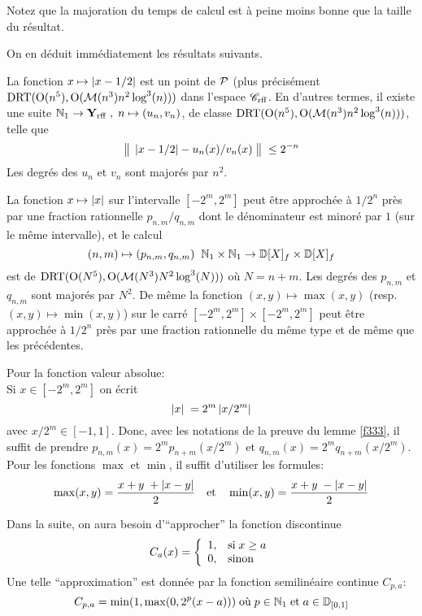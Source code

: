 Notez que la majoration du temps de calcul est à peine moins bonne que la 
taille du résultat.

On en déduit immédiatement les résultats suivants.
\begin{ftheorem} \label{f334}
La fonction   $x \mapsto \left|{ x - 1/2 }\right|$ est un point de \com ${\cal P}$   (plus 
précisément  ${\rm DRT}({\rm O}(n^5), {\rm O}({{{\cal M}}}(n^3) n^2 \log^3(n)))$   
dans l'espace  ${{{\mathscr C}}_{\rm rff}}$. 
En d'autres termes, il existe une suite  
$\mathbb {N}_1 \rightarrow {{\bf Y}_{\rm rff}}  \; , \; 
n \mapsto (u_n,v_n)$, de classe
 ${\rm DRT}({\rm O}(n^5), {\rm O}({{{\cal M}}}(n^3) n^2 \log^3(n)))$, telle que         
\[
\big\lVert  \; \left|{ x-1/2 }\right| - u_n(x)/v_n(x)\;  \big\rVert \; \leq 2^{-n}
\]
Les degrés des \pols  $u_n$  et  $v_n$ sont majorés par   $n^2$.
\end{ftheorem}
\begin{fproposition} \label{f335}
La fonction  $x \mapsto \left|{x}\right|$ sur l'intervalle  $[-2^m , 2^m]$  peut 
être approchée à  $1/2^n$   près  par une fraction rationnelle  
$p_{n,m}/q_{n,m}$  dont le dénominateur est minoré par  $1$  (sur le même 
intervalle),  et le calcul  
$$(n,m) \mapsto (p_{n,m},q_{n,m}) \; \; \mathbb {N}_1 \times \mathbb {N}_1 \rightarrow
 \mathbb {D}[X]_f \times \mathbb {D}[X]_f $$
est de \com  ${\rm DRT}({\rm O}(N^5), {\rm O}({{{\cal M}}}(N^3) N^2 \log^3(N)))$  
où  $N = n+m$.  Les degrés des \pols  
$p_{n,m}$  et  $q_{n,m}$ sont majorés par   $N^2$.
De même la fonction $(x,y) \mapsto \max(x,y)$ 
(resp. $(x,y) \mapsto \min(x,y)$)  sur le carré  
$[-2^m,2^m] \times  [-2^m,2^m]$  peut être approchée à  $1/2^n$   
près  par une fraction rationnelle du même type et de même \com 
que les précédentes.
\end{fproposition}

\proof 	Pour la fonction valeur absolue:\\
Si   $x \in [-2^m , 2^m]$  on écrit   
\[
\left|{x}\right|\;  = 2^m \left|{ x/2^m }\right| 
\]
avec  $x/2^m \in [-1 , 1]$. Donc, avec les notations de la preuve du lemme 
\ref{f333}, il suffit de prendre    $p_{n,m}(x) = 2^m p_{n+m}(x/2^m)$  et   
$q_{n,m}(x) = 2^m q_{n+m}(x/2^m)$.\\
Pour les fonctions $\max$ et $\min$, il suffit d'utiliser les formules:	
\[
\max(x,y) = \frac{x+y\; + \left|{x-y}\right|} {2}\quad  \hbox{et} \quad  
\min (x,y) = \frac{x+y\; - \left|{x-y}\right|}{2} 
\]
\eop

\medskip Dans la suite, on aura besoin d'``approcher'' la fonction discontinue
\[  
C_a(x) = \left\{
\begin{array}{cl}
1, & \hbox{si} \; x \geq a \\
0, & \hbox{sinon} 
\end{array}
\right.
\] 
Une telle ``approximation''  est donnée par la fonction semilinéaire continue  
$ C_{p,a}$:
\[
C_{p,a} = \min(1, \max(0, 2^p(x - a))) \; \hbox{où} \; p \in \mathbb {N}_1 
\; \hbox{et} \; a \in \mathbb {D}_{[0,1]}
\] 


